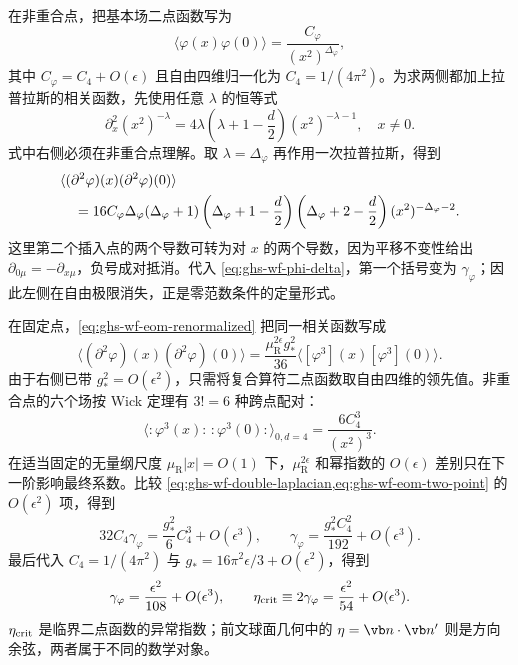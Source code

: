在非重合点，把基本场二点函数写为
\begin{equation}\label{eq:ghs-wf-phi-two-point}
 \langle\varphi(x)\varphi(0)\rangle=\frac{C_\varphi}{(x^2)^{\Delta_\varphi}},
\end{equation}
其中 $C_\varphi=C_4+O(\epsilon)$ 且自由四维归一化为 $C_4=1/(4\pi^2)$。为求两侧都加上拉普拉斯的相关函数，先使用任意 $\lambda$ 的恒等式
\begin{equation}\label{eq:ghs-wf-laplacian-power}
 \partial_x^2 (x^2)^{-\lambda}
 =4\lambda\left(\lambda+1-\frac d2\right)(x^2)^{-\lambda-1},\quad x\ne0.
\end{equation}
式中右侧必须在非重合点理解。取 $\lambda=\Delta_\varphi$ 再作用一次拉普拉斯，得到
\begin{align}\label{eq:ghs-wf-double-laplacian}
 &\langle(\partial^2\varphi)(x)(\partial^2\varphi)(0)\rangle\\
 &\quad=16C_\varphi\Delta_\varphi(\Delta_\varphi+1)
 \left(\Delta_\varphi+1-\frac d2\right)
 \left(\Delta_\varphi+2-\frac d2\right)
 (x^2)^{-\Delta_\varphi-2}.\notag
\end{align}
这里第二个插入点的两个导数可转为对 $x$ 的两个导数，因为平移不变性给出 $\partial_{0\mu}=-\partial_{x\mu}$，负号成对抵消。代入 \cref{eq:ghs-wf-phi-delta}，第一个括号变为 $\gamma_\varphi$；因此左侧在自由极限消失，正是零范数条件的定量形式。


在固定点，\cref{eq:ghs-wf-eom-renormalized} 把同一相关函数写成
\begin{equation}\label{eq:ghs-wf-eom-two-point}
 \langle(\partial^2\varphi)(x)(\partial^2\varphi)(0)\rangle
 =\frac{\mu_{\mathrm R}^{2\epsilon}g_*^2}{36}
 \langle[\varphi^3](x)[\varphi^3](0)\rangle.
\end{equation}
由于右侧已带 $g_*^2=O(\epsilon^2)$，只需将复合算符二点函数取自由四维的领先值。非重合点的六个场按 Wick 定理有 $3!=6$ 种跨点配对：
\begin{equation}\label{eq:ghs-wf-phi3-free-wick}
 \langle:\!\varphi^3(x)\!:\,:\!\varphi^3(0)\!:\rangle_{0,d=4}
 =\frac{6 C_4^3}{(x^2)^3}.
\end{equation}
在适当固定的无量纲尺度 $\mu_{\mathrm R}|x|=O(1)$ 下，$\mu_{\mathrm R}^{2\epsilon}$ 和幂指数的 $O(\epsilon)$ 差别只在下一阶影响最终系数。比较 \cref{eq:ghs-wf-double-laplacian,eq:ghs-wf-eom-two-point} 的 $O(\epsilon^2)$ 项，得到
\begin{equation}\label{eq:ghs-wf-phi-anomalous-from-eom}
 32C_4\gamma_\varphi
 =\frac{g_*^2}{6}C_4^3+O(\epsilon^3),
 \qquad
 \gamma_\varphi=\frac{g_*^2 C_4^2}{192}+O(\epsilon^3).
\end{equation}
最后代入 $C_4=1/(4\pi^2)$ 与 $g_*=16\pi^2\epsilon/3+O(\epsilon^2)$，得到
\begin{equation}\label{eq:ghs-wf-phi-gamma-result}
 \gamma_\varphi=\frac{\epsilon^2}{108}+O(\epsilon^3),
 \qquad \eta_{\rm crit}\equiv2\gamma_\varphi=\frac{\epsilon^2}{54}+O(\epsilon^3).
\end{equation}
$\eta_{\rm crit}$ 是临界二点函数的异常指数；前文球面几何中的 $\eta=\vb n\cdot\vb n'$ 则是方向余弦，两者属于不同的数学对象。



